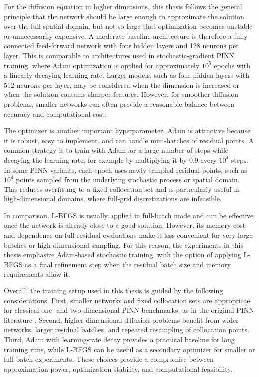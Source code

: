 For the diffusion equation in higher dimensions, this thesis follows the general principle that the network should be large enough to approximate the solution over the full spatial domain, but not so large that optimization becomes unstable or unnecessarily expensive. A moderate baseline architecture is therefore a fully connected feed-forward network with four hidden layers and 128 neurons per layer. This is comparable to architectures used in stochastic-gradient PINN training, where Adam optimization is applied for approximately $10^5$ epochs with a linearly decaying learning rate. Larger models, such as four hidden layers with 512 neurons per layer, may be considered when the dimension is increased or when the solution contains sharper features. However, for smoother diffusion problems, smaller networks can often provide a reasonable balance between accuracy and computational cost.

The optimizer is another important hyperparameter. Adam is attractive because it is robust, easy to implement, and can handle mini-batches of residual points. A common strategy is to train with Adam for a large number of steps while decaying the learning rate, for example by multiplying it by 0.9 every $10^4$ steps. In some PINN variants, each epoch uses newly sampled residual points, such as $10^4$ points sampled from the underlying stochastic process or spatial domain. This reduces overfitting to a fixed collocation set and is particularly useful in high-dimensional domains, where full-grid discretizations are infeasible.

In comparison, L-BFGS is usually applied in full-batch mode and can be effective once the network is already close to a good solution. However, its memory cost and dependence on full residual evaluations make it less convenient for very large batches or high-dimensional sampling. For this reason, the experiments in this thesis emphasize Adam-based stochastic training, with the option of applying L-BFGS as a final refinement step when the residual batch size and memory requirements allow it.

Overall, the training setup used in this thesis is guided by the following considerations. First, smaller networks and fixed collocation sets are appropriate for classical one- and two-dimensional PINN benchmarks, as in the original PINN literature \cite{pinns_original}. Second, higher-dimensional diffusion problems benefit from wider networks, larger residual batches, and repeated resampling of collocation points. Third, Adam with learning-rate decay provides a practical baseline for long training runs, while L-BFGS can be useful as a secondary optimizer for smaller or full-batch experiments. These choices provide a compromise between approximation power, optimization stability, and computational feasibility.